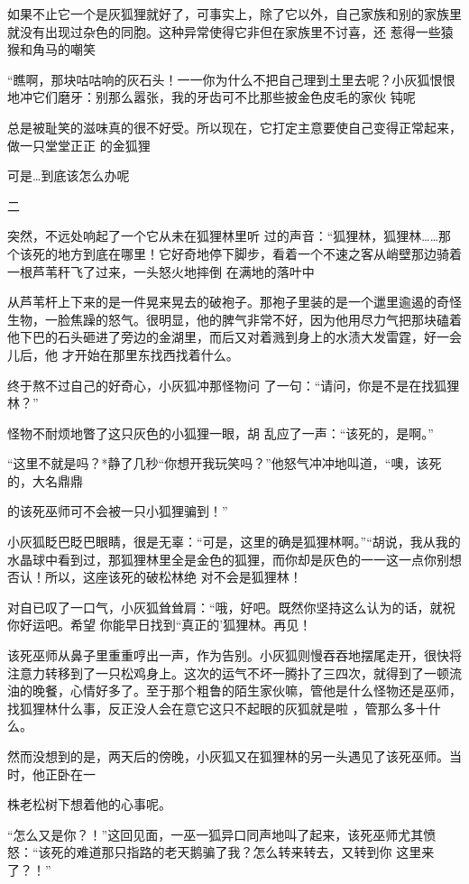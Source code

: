 \documentclass{article}
\begin{document}
如果不止它一个是灰狐狸就好了，可事实上，除了它以外，自己家族和别的家族里就没有出现过杂色的同胞。这种异常使得它非但在家族里不讨喜，还
惹得一些猿猴和角马的嘲笑 

“瞧啊，那块咕咕响的灰石头！一一你为什么不把自己理到土里去呢？小灰狐恨恨地冲它们磨牙：别那么嚣张，我的牙齿可不比那些披金色皮毛的家伙
钝呢 

总是被耻笑的滋味真的很不好受。所以现在，它打定主意要使自己变得正常起来，做一只堂堂正正
的金狐狸 


可是…到底该怎么办呢 


二 

突然，不远处响起了一个它从未在狐狸林里听
\newpage
过的声音：“狐狸林，狐狸林……那个该死的地方到底在哪里！它好奇地停下脚步，看着一个不速之客从峭壁那边骑着一根芦苇秆飞了过来，一头怒火地摔倒
在满地的落叶中 

从芦苇杆上下来的是一件晃来晃去的破袍子。那袍子里装的是一个邋里逾遏的奇怪生物，一脸焦躁的怒气。很明显，他的脾气非常不好，因为他用尽力气把那块磕着他下巴的石头砸进了旁边的金湖里，而后又对着溅到身上的水渍大发雷霆，好一会儿后，他
才开始在那里东找西找着什么。 

终于熬不过自己的好奇心，小灰狐冲那怪物问
了一句：“请问，你是不是在找狐狸林？” 

怪物不耐烦地瞥了这只灰色的小狐狸一眼，胡
乱应了一声：“该死的，是啊。” 

“这里不就是吗？*静了几秒“你想开我玩笑吗？”他怒气冲冲地叫道，“噢，该死的，大名鼎鼎

\newpage
的该死巫师可不会被一只小狐狸骗到！” 

小灰狐眨巴眨巴眼睛，很是无辜：“可是，这里的确是狐狸林啊。”“胡说，我从我的水晶球中看到过，那狐狸林里全是金色的狐狸，而你却是灰色的一一这一点你别想否认！所以，这座该死的破松林绝
对不会是狐狸林！ 

对自已叹了一口气，小灰狐耸耸肩：“哦，好吧。既然你坚持这么认为的话，就祝你好运吧。希望
你能早日找到“真正的’狐狸林。再见！ 

该死巫师从鼻子里重重哼出一声，作为告别。小灰狐则慢吞吞地摆尾走开，很快将注意力转移到了一只松鸡身上。这次的运气不坏一腾扑了三四次，就得到了一顿流油的晚餐，心情好多了。至于那个粗鲁的陌生家伙嘛，管他是什么怪物还是巫师，找狐狸林什么事，反正没人会在意它这只不起眼的灰狐就是啦
，管那么多十什么。 

然而没想到的是，两天后的傍晚，小灰狐又在狐狸林的另一头遇见了该死巫师。当时，他正卧在一
\newpage

株老松树下想着他的心事呢。 

“怎么又是你？！”这回见面，一巫一狐异口同声地叫了起来，该死巫师尤其愤怒：“该死的难道那只指路的老天鹅骗了我？怎么转来转去，又转到你
这里来了？！” 
\end{document}
